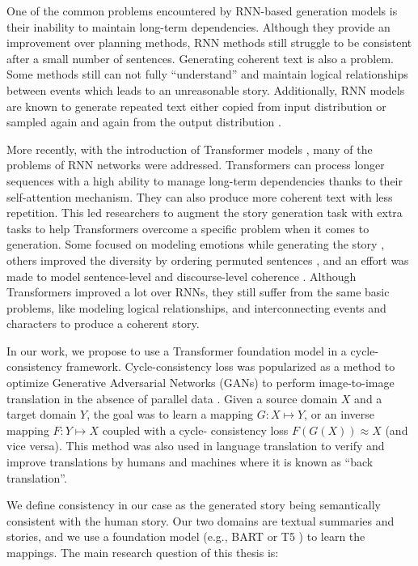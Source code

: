 One of the common problems encountered by RNN-based generation models is their inability to maintain long-term dependencies. Although they provide an improvement over planning methods, RNN methods still struggle to be consistent after a small number of sentences. Generating coherent text is also a problem. Some methods still can not fully ``understand'' and maintain logical relationships between events which leads to an unreasonable story. Additionally, RNN models are known to generate repeated text either copied from input distribution or sampled again and again from the output distribution \citep{herrera2020automatic}.

More recently, with the introduction of Transformer models \citep{vaswani2017attention}, many of the problems of RNN networks were addressed. Transformers can process longer sequences with a high ability to manage long-term dependencies thanks to their self-attention mechanism. They can also produce more coherent text with less repetition. This led researchers to augment the story generation task with extra tasks to help Transformers overcome a specific problem when it comes to generation. Some focused on modeling emotions while generating the story \citep{brahman2020modeling, kong2021stylized}, others improved the diversity by ordering permuted sentences \citep{yu2021sentence}, and an effort was made to model sentence-level and discourse-level coherence \citep{guan2021long}. Although Transformers improved a lot over RNNs, they still suffer from the same basic problems, like modeling logical relationships, and interconnecting events and characters to produce a coherent story.

In our work, we propose to use a Transformer foundation model \citep{bommasani2021opportunities} in a cycle-consistency framework. Cycle-consistency loss was popularized as a method to optimize Generative Adversarial Networks (GANs) to perform image-to-image translation in the absence of parallel data \citep{zhu2017unpaired}. Given a source domain $X$ and a target domain $Y$, the goal was to learn a mapping $G \colon X \mapsto Y$, or an inverse mapping $F \colon Y \mapsto X$ coupled with a cycle-	consistency loss $F(G(X)) \approx X$ (and vice versa). This method was also used in language translation to verify and improve translations by humans \citep{brislin1970back} and machines \citep{he2016dual} where it is known as ``back translation''.

We define consistency in our case as the generated story being semantically consistent with the human story. Our two domains are textual summaries and stories, and we use a foundation model (e.g., BART \citep{lewis2019bart} or T5 \citep{raffel2019exploring}) to learn the mappings. The main research question of this thesis is:

